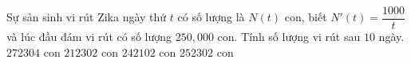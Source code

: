 \begin{ex}%
	Sự sản sinh vi rút Zika ngày thứ $t$ có số lượng là $N(t)$ con, biết $N'(t)=\dfrac{1000}{t}$ và lúc đầu đám vi rút có số lượng $250{,}000$ con. Tính số lượng vi rút sau $10$ ngày.
	\choice
	{$272304$ con}
	{$212302$ con}
	{$242102$ con}
	{\True $252302$ con}
\end{ex}

